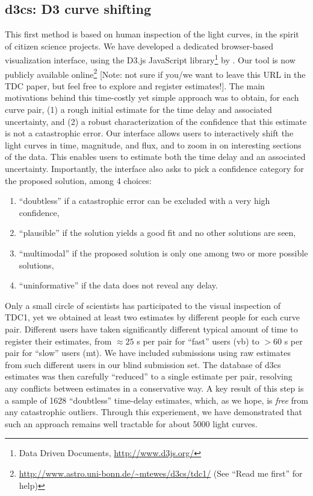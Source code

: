 \documentclass[traditabstract]{aa}
\begin{document}
\subsection{d3cs: D3 curve shifting}
This first method is based on human inspection of the light curves, in the spirit of citizen science projects. We have developed a dedicated browser-based visualization interface, using the D3.js JavaScript library\footnote{Data Driven Documents, \url{http://www.d3js.org/}} by \citet{d3}. Our tool is now publicly available online\footnote{\url{http://www.astro.uni-bonn.de/~mtewes/d3cs/tdc1/} (See ``Read me first'' for help)} [Note: not sure if you/we want to leave this URL in the TDC paper, but feel free to explore and register estimates!]. The main motivations behind this time-costly yet simple approach was to obtain, for each curve pair, (1) a rough initial estimate for the time delay and associated uncertainty, and (2) a robust characterization of the confidence that this estimate is not a catastrophic error. Our interface allows users to interactively shift the light curves in time, magnitude, and flux, and to zoom in on interesting sections of the data. This enables users to estimate both the time delay and an associated uncertainty. Importantly, the interface also asks to pick a confidence category for the proposed solution, among 4 choices:
\begin{enumerate}
\item ``doubtless'' if a catastrophic error can be excluded with a very high confidence,
\item ``plausible'' if the solution yields a good fit and no other solutions are seen,
\item ``multimodal'' if the proposed solution is only one among two or more possible solutions,
\item ``uninformative'' if the data does not reveal any delay.
\end{enumerate}
Only a small circle of scientists has participated to the visual inspection of TDC1, yet we obtained at least two estimates by different people for each curve pair. Different users have taken significantly different typical amount of time to register their estimates, from $\approx 25$ s per pair for ``fast'' users (vb) to $> 60$ s per pair for ``slow'' users (mt). We have included submissions using raw estimates from such different users in our blind submission set. The database of d3cs estimates was then carefully ``reduced'' to a single estimate per pair, resolving any conflicts between estimates in a conservative way. A key result of this step is a sample of 1628 ``doubtless'' time-delay estimates, which, as we hope, is \emph{free} from any catastrophic outliers. Through this experiement, we have demonstrated that such an approach remains well tractable for about 5000 light curves.
\end{document}
